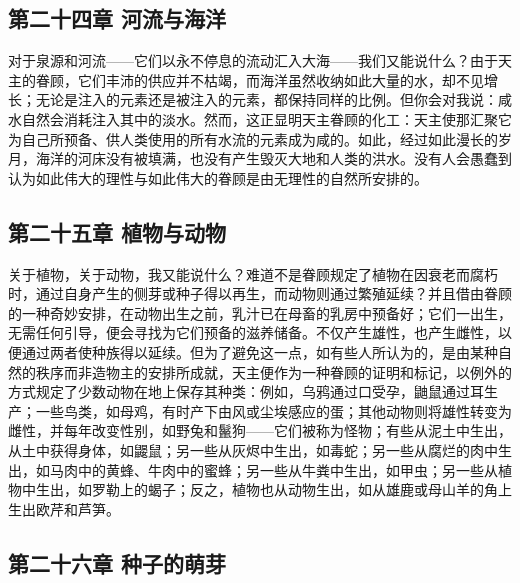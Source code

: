 
\subsection{第二十四章 河流与海洋}

对于泉源和河流——它们以永不停息的流动汇入大海——我们又能说什么？由于天主的眷顾，它们丰沛的供应并不枯竭，而海洋虽然收纳如此大量的水，却不见增长；无论是注入的元素还是被注入的元素，都保持同样的比例。但你会对我说：咸水自然会消耗注入其中的淡水。然而，这正显明天主眷顾的化工：天主使那汇聚它为自己所预备、供人类使用的所有水流的元素成为咸的。如此，经过如此漫长的岁月，海洋的河床没有被填满，也没有产生毁灭大地和人类的洪水。没有人会愚蠢到认为如此伟大的理性与如此伟大的眷顾是由无理性的自然所安排的。\par


\subsection{第二十五章 植物与动物}

关于植物，关于动物，我又能说什么？难道不是眷顾规定了植物在因衰老而腐朽时，通过自身产生的侧芽或种子得以再生，而动物则通过繁殖延续？并且借由眷顾的一种奇妙安排，在动物出生之前，乳汁已在母畜的乳房中预备好；它们一出生，无需任何引导，便会寻找为它们预备的滋养储备。不仅产生雄性，也产生雌性，以便通过两者使种族得以延续。但为了避免这一点，如有些人所认为的，是由某种自然的秩序而非造物主的安排所成就，天主便作为一种眷顾的证明和标记，以例外的方式规定了少数动物在地上保存其种类：例如，乌鸦通过口受孕，鼬鼠通过耳生产；一些鸟类，如母鸡，有时产下由风或尘埃感应的蛋；其他动物则将雄性转变为雌性，并每年改变性别，如野兔和鬣狗——它们被称为怪物；有些从泥土中生出，从土中获得身体，如鼹鼠；另一些从灰烬中生出，如毒蛇；另一些从腐烂的肉中生出，如马肉中的黄蜂、牛肉中的蜜蜂；另一些从牛粪中生出，如甲虫；另一些从植物中生出，如罗勒上的蝎子；反之，植物也从动物生出，如从雄鹿或母山羊的角上生出欧芹和芦笋。\par


\subsection{第二十六章 种子的萌芽}

